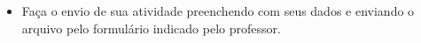 \documentclass[12pt,answers]{exam}
\providecommand{\disciplina}[1]{\renewcommand{\disciplina}{#1}}
\begin{document}
{{{\begin{itemize}
    \item Faça o envio de sua atividade preenchendo com seus dados e enviando o arquivo pelo formulário indicado pelo professor. %
    


\end{itemize}
}}}

\fontsize{12}{12}\selectfont

\vspace{-10mm}


\newpage


\begin{center}
{\LARGE{\disciplina}}\\
\end{center}


 
\end{document}
